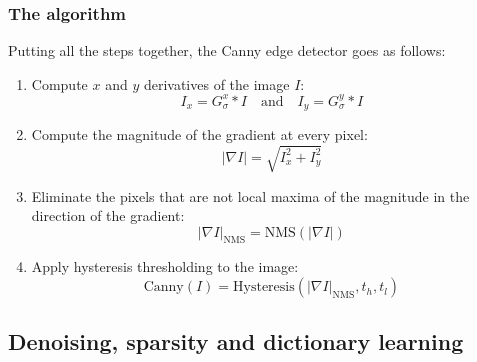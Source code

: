 \subsubsection{The algorithm}
Putting all the steps together, the Canny edge detector goes as follows:
\begin{enumerate}
    \item Compute $x$ and $y$ derivatives of the image $I$:
    \begin{equation*}
        I_x = G^x_\sigma * I \quad \text{and} \quad I_y = G^y_\sigma * I
    \end{equation*}
    \item Compute the magnitude of the gradient at every pixel:
    \begin{equation*}
        |\nabla I| = \sqrt{I_x^2 + I_y^2}
    \end{equation*}
    \item Eliminate the pixels that are not local maxima of the magnitude in the direction of the gradient:
    \begin{equation*}
        |\nabla I|_{\text{NMS}} = \text{NMS}(|\nabla I|)
    \end{equation*}
    \item Apply hysteresis thresholding to the image:
    \begin{equation*}
        \text{Canny}(I) = \text{Hysteresis}(|\nabla I|_{\text{NMS}}, t_h, t_l)
    \end{equation*}
\end{enumerate}

\subsection{Denoising, sparsity and dictionary learning}